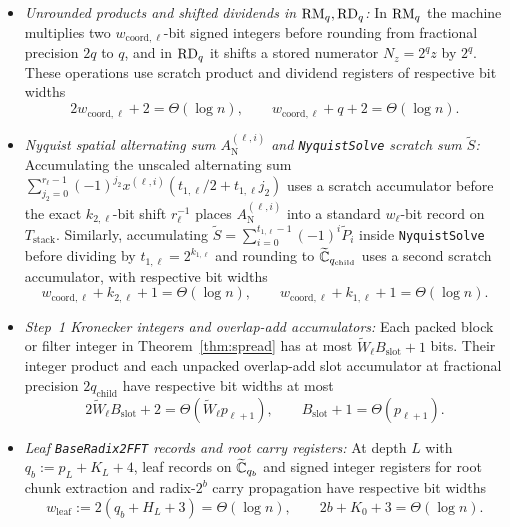 \begin{itemize}[leftmargin=*,nosep]
  \item \emph{Unrounded products and shifted dividends in $\operatorname{RM}_q, \operatorname{RD}_q$:} In $\operatorname{RM}_q$ the machine multiplies two $w_{\mathrm{coord},\ell}$-bit signed integers before rounding from fractional precision $2q$ to $q$, and in $\operatorname{RD}_q$ it shifts a stored numerator $N_z = 2^q z$ by $2^q$. These operations use scratch product and dividend registers of respective bit widths
  \[
    2 w_{\mathrm{coord},\ell} + 2 = \Theta(\log n), \qquad w_{\mathrm{coord},\ell} + q + 2 = \Theta(\log n).
  \]
  \item \emph{Nyquist spatial alternating sum $A_{\mathrm{N}}^{(\ell, i)}$ and \texttt{NyquistSolve} scratch sum $\tilde{S}$:} Accumulating the unscaled alternating sum $\sum_{j_2=0}^{r_\ell-1} (-1)^{j_2} x^{(\ell, i)}(t_{1,\ell}/2 + t_{1,\ell} j_2)$ uses a scratch accumulator before the exact $k_{2,\ell}$-bit shift $r_\ell^{-1}$ places $A_{\mathrm{N}}^{(\ell, i)}$ into a standard $w_\ell$-bit record on $T_{\mathrm{stack}}$. Similarly, accumulating $\tilde{S} = \sum_{i=0}^{t_{1,\ell}-1} (-1)^i \tilde{P}_i$ inside \texttt{NyquistSolve} before dividing by $t_{1,\ell} = 2^{k_{1,\ell}}$ and rounding to $\widetilde{\mathbb{C}}_{q_{\mathrm{child}}}$ uses a second scratch accumulator, with respective bit widths
  \[
    w_{\mathrm{coord},\ell} + k_{2,\ell} + 1 = \Theta(\log n), \qquad w_{\mathrm{coord},\ell} + k_{1,\ell} + 1 = \Theta(\log n).
  \]
  \item \emph{Step~1 Kronecker integers and overlap-add accumulators:} Each packed block or filter integer in Theorem~\ref{thm:spread} has at most $\tilde{W}_\ell B_{\mathrm{slot}} + 1$ bits. Their integer product and each unpacked overlap-add slot accumulator at fractional precision $2 q_{\mathrm{child}}$ have respective bit widths at most
  \[
    2 \tilde{W}_\ell B_{\mathrm{slot}} + 2 = \Theta(\tilde{W}_\ell p_{\ell+1}), \qquad B_{\mathrm{slot}} + 1 = \Theta(p_{\ell+1}).
  \]
  \item \emph{Leaf \texttt{BaseRadix2FFT} records and root carry registers:} At depth $L$ with $q_b := p_L + K_L + 4$, leaf records on $\widetilde{\mathbb{C}}_{q_b}$ and signed integer registers for root chunk extraction and radix-$2^b$ carry propagation have respective bit widths
  \[
    w_{\mathrm{leaf}} := 2(q_b + H_L + 3) = \Theta(\log n), \qquad 2b + K_0 + 3 = \Theta(\log n).
  \]
\end{itemize}

